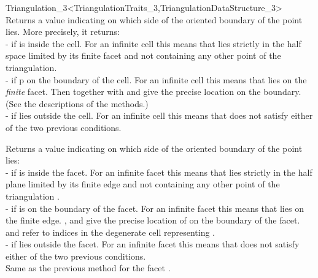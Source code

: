 \begin{ccRefClass}{Triangulation_3<TriangulationTraits_3,TriangulationDataStructure_3>}
{Returns a value indicating on which side of the oriented boundary
of  the point  lies. More precisely, it returns:\\
-  if  is inside the cell. For an infinite
cell this means that  lies strictly in the half space limited by
its finite facet and not containing any other point of the triangulation. \\
-  if p on the boundary of the cell. For an infinite
cell this means that  lies on the \textit{finite} facet. Then
 together with  and  give the precise location
on the boundary. (See the descriptions of the  methods.)\\ 
-  if  lies outside the cell. For an
infinite cell this means that  does not satisfy either of the
two previous conditions.  
}

{Returns a value indicating on which side of the oriented boundary
of  the point  lies:\\
-  if  is inside the facet. For an
infinite facet this means that  lies strictly in the half plane
limited by its finite edge and not containing any other point of the
triangulation . \\
-  if  is on the boundary of the facet.
For an infinite facet this means that  lies on the finite
edge. ,  and  give the precise location of
 on the boundary of the facet.  and  refer to
indices in the degenerate cell  representing .\\
-  if  lies outside the facet. For
an infinite facet this means that  does not satisfy either of
the two previous conditions. \\
}
\ccGlue
{}
{Same as the previous method for the facet .}


\end{ccRefClass}
